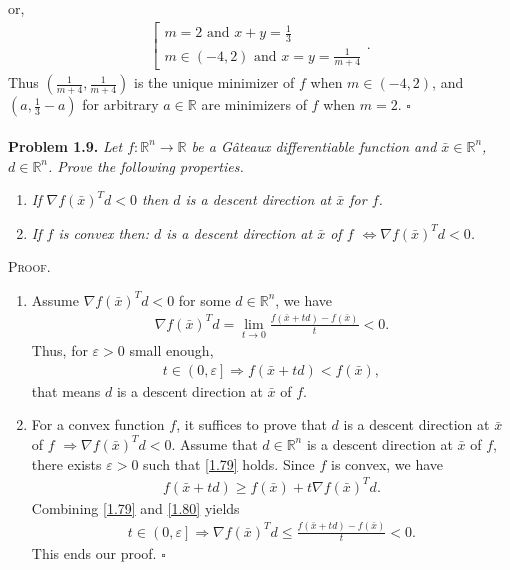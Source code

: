 \documentclass[a4paper]{article}
\numberwithin{equation}{section}
\begin{document}
or,
\begin{align}
\left[ {\begin{array}{*{20}{c}}
{m = 2\mbox{ and } x + y = \frac{1}{3}}\\
{m \in \left( { - 4,2} \right)\mbox{ and } x = y = \frac{1}{{m + 4}}}
\end{array}} \right. .
\end{align}
Thus $\left(\frac{1}{m+4},\frac{1}{m+4}\right)$ is the unique minimizer of $f$ when $m\in \left(-4,2\right)$, and $\left(a,\frac{1}{3}-a\right)$ for arbitrary $a\in \mathbb{R}$ are minimizers of $f$ when $m=2$. \hfill $\square$\\
\\
\textbf{Problem 1.9.} \textit{Let $f:\mathbb{R}^n \to \mathbb{R}$ be a G\^{a}teaux differentiable function and $\bar x \in \mathbb{R}^n$, $d\in \mathbb{R}^n$. Prove the following properties.}
\begin{enumerate}
\item \textit{If $\nabla f{\left( {\bar x} \right)^T}d < 0$ then $d$ is a descent direction at $\bar x$ for $f$.}
\item \textit{If $f$ is convex then: $d$ is a descent direction at $\bar x$ of $f$ $ \Leftrightarrow \nabla f{\left( {\bar x} \right)^T}d < 0$.}
\end{enumerate}
\textsc{Proof.}
\begin{enumerate}
\item Assume $\nabla f{\left( {\bar x} \right)^T}d<0$ for some $d\in \mathbb{R}^n$, we have
\begin{align}
\nabla f{\left( {\bar x} \right)^T}d = \mathop {\lim }\limits_{t \to 0} \frac{{f\left( {\bar x + td} \right) - f\left( {\bar x} \right)}}{t} < 0.
\end{align}
Thus, for $\varepsilon>0$ small enough, 
\begin{align}
\label{1.79}
t \in \left( {0,\varepsilon } \right] \Rightarrow f\left( {\bar x + td} \right) < f\left( {\bar x} \right),
\end{align}
that means $d$ is a descent direction at $\bar x$ of $f$.
\item For a convex function $f$, it suffices to prove that $d$ is a descent direction at $\bar x$ of $f$ $\Rightarrow \nabla f{\left( {\bar x} \right)^T}d < 0$. Assume that $d \in \mathbb{R}^n$ is a descent direction at $\bar x$ of $f$, there exists $\varepsilon >0$ such that \eqref{1.79} holds. Since $f$ is convex, we have
\begin{align}
\label{1.80}
f\left( {\bar x + td} \right) \ge f\left( {\bar x} \right) + t\nabla f{\left( {\bar x} \right)^T}d.
\end{align}
Combining \eqref{1.79} and \eqref{1.80} yields
\begin{align}
t \in \left( {0,\varepsilon } \right] \Rightarrow \nabla f{\left( {\bar x} \right)^T}d \le \frac{{f\left( {\bar x + td} \right) - f\left( {\bar x} \right)}}{t} < 0 .
\end{align}
This ends our proof. \hfill $\square$
\end{enumerate}
\end{document}
